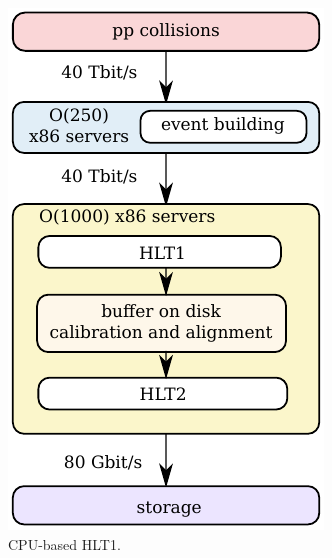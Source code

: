 \begin{figure}[!htb]
    \centering
    \begin{subfigure}[t]{0.36\textwidth}
        \centering
        \includegraphics[width=\textwidth]{./figs-lhcb-upgrade-overview/trigger/data_path_cpu.pdf}
        \caption{CPU-based HLT1.}
    \end{subfigure}
    \hspace{20pt}
    \begin{subfigure}[t]{0.36\textwidth}
        \centering

\end{subfigure}
\end{figure}
